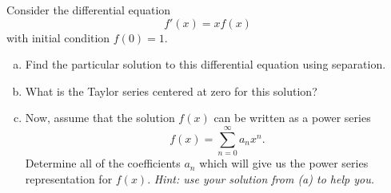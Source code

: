 \documentclass[12pt]{article} %
\begin{document}
\newpage
\begin{problem}
Consider the differential equation
\[
f'(x)=xf(x)
\]
with initial condition $f(0)=1$.  
\begin{enumerate}[(a)]
    \item Find the particular solution to this differential equation using separation.
    \item What is the Taylor series centered at zero for this solution?
    \item Now, assume that the solution $f(x)$ can be written as a power series
    \[
    f(x) = \sum_{n=0}^\infty a_n x^n.
    \]
    Determine all of the coefficients $a_n$ which will give us the power series representation for $f(x)$. \emph{Hint: use your solution from (a) to help you.}
\end{enumerate}
\end{problem}
\end{document}
